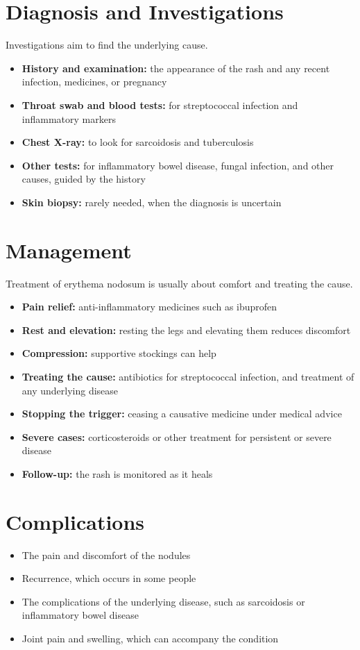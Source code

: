 \section*{Diagnosis and Investigations}
Investigations aim to find the underlying cause.
\begin{itemize}
    \item \textbf{History and examination:} the appearance of the rash and any recent infection, medicines, or pregnancy
    \item \textbf{Throat swab and blood tests:} for streptococcal infection and inflammatory markers
    \item \textbf{Chest X-ray:} to look for sarcoidosis and tuberculosis
    \item \textbf{Other tests:} for inflammatory bowel disease, fungal infection, and other causes, guided by the history
    \item \textbf{Skin biopsy:} rarely needed, when the diagnosis is uncertain
\end{itemize}

\section*{Management}
Treatment of erythema nodosum is usually about comfort and treating the cause.
\begin{itemize}
    \item \textbf{Pain relief:} anti-inflammatory medicines such as ibuprofen
    \item \textbf{Rest and elevation:} resting the legs and elevating them reduces discomfort
    \item \textbf{Compression:} supportive stockings can help
    \item \textbf{Treating the cause:} antibiotics for streptococcal infection, and treatment of any underlying disease
    \item \textbf{Stopping the trigger:} ceasing a causative medicine under medical advice
    \item \textbf{Severe cases:} corticosteroids or other treatment for persistent or severe disease
    \item \textbf{Follow-up:} the rash is monitored as it heals
\end{itemize}

\section*{Complications}
\begin{itemize}
    \item The pain and discomfort of the nodules
    \item Recurrence, which occurs in some people
    \item The complications of the underlying disease, such as sarcoidosis or inflammatory bowel disease
    \item Joint pain and swelling, which can accompany the condition
\end{itemize}

